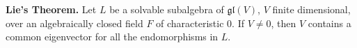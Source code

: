 \textbf{Lie's Theorem.} Let $L$ be a solvable subalgebra of $\mathfrak{gl}(V)$, $V$ finite dimensional, over an algebraically closed field $F$ of characteristic $0$. If $V \neq 0$, then $V$ contains a common eigenvector for all the endomorphisms in $L$.
